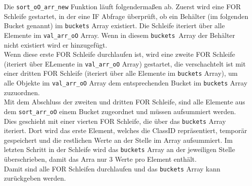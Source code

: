 {	Die \lstinline|sort_oO_arr_new| Funktion läuft folgendermaßen ab. Zuerst wird eine FOR Schleife gestartet, in der eine IF Abfrage überprüft, ob ein Behälter (im folgenden \glqq Bucket\grqq{} genannt) im \lstinline|buckets| Array existiert. Die Schleife iteriert über alle Elemente im  \lstinline|val_arr_oO| Array. Wenn in diesem \lstinline|buckets |Array der Behälter nicht existiert wird er hinzugefügt. \\
	Wenn diese erste FOR Schleife durchlaufen ist, wird eine zweite FOR Schleife (iteriert über ELemente in \lstinline|val_arr_oO| Array) gestartet, die verschachtelt ist mit einer dritten FOR Schleife (iteriert über alle Elemente im \lstinline|buckets| Array), um alle Objekte im \lstinline|val_arr_oO| Array dem entsprechenden Bucket im \lstinline|buckets| Array zuzuordnen. \\
	Mit dem Abschluss der zweiten und dritten FOR Schleife, sind alle Elemente aus dem \lstinline|sort_arr_oO| einem Bucket zugeordnet und müssen aufsummiert werden. Dies geschieht mit einer vierten FOR Schleife, die über das \lstinline|buckets| Array iteriert. Dort wird das erste Element, welches die ClassID repräsentiert, temporär gespeichert und die restlichen Werte an der Stelle im Array aufsummiert. Im letzten Schritt in der Schleife wird das \lstinline|buckets| Array an der jeweiligen Stelle überschrieben, damit das Arra nur 3 Werte pro Element enthält. \\ 
	Damit sind alle FOR Schleifen durchlaufen und das \lstinline|buckets| Array kann zurückgeben werden.
	\fi

}







